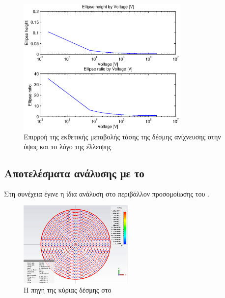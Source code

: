 \begin{figure}[tbh]
\includegraphics[width=0.75\textwidth]{figures/beam_deflection_script_07}
\centering
\caption{Επιρροή της εκθετικής μεταβολής τάσης της δέσμης ανίχνευσης στην ύψος και το λόγο της έλλειψης}
\label{fig:beam_deflection_script_07}
\end{figure}

\subsection{Αποτελέσματα ανάλυσης με το }

Στη συνέχεια έγινε η ίδια ανάλυση στο περιβάλλον προσομοίωσης του . 



\begin{figure}[tbh]
\includegraphics[width=0.5\textwidth]{figures/CST-main-beam-source}
\centering
\caption{Η πηγή της κύριας δέσμης στο }
\label{fig:CST-mainBeamSource}
\end{figure}

